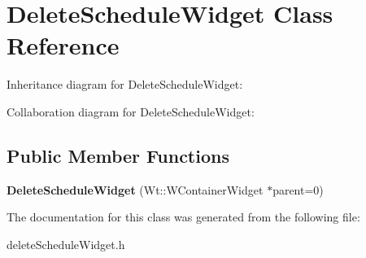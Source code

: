 \hypertarget{classDeleteScheduleWidget}{}\section{Delete\+Schedule\+Widget Class Reference}
\label{classDeleteScheduleWidget}


Inheritance diagram for Delete\+Schedule\+Widget\+:


Collaboration diagram for Delete\+Schedule\+Widget\+:
\subsection*{Public Member Functions}
\begin{DoxyCompactItemize}
\item 
\mbox{\label{classDeleteScheduleWidget_aa707aafd02803a41f15beb8018e354e7}} 
{\bfseries Delete\+Schedule\+Widget} (Wt\+::\+W\+Container\+Widget $\ast$parent=0)
\end{DoxyCompactItemize}


The documentation for this class was generated from the following file\+:\begin{DoxyCompactItemize}
\item 
delete\+Schedule\+Widget.\+h\end{DoxyCompactItemize}
